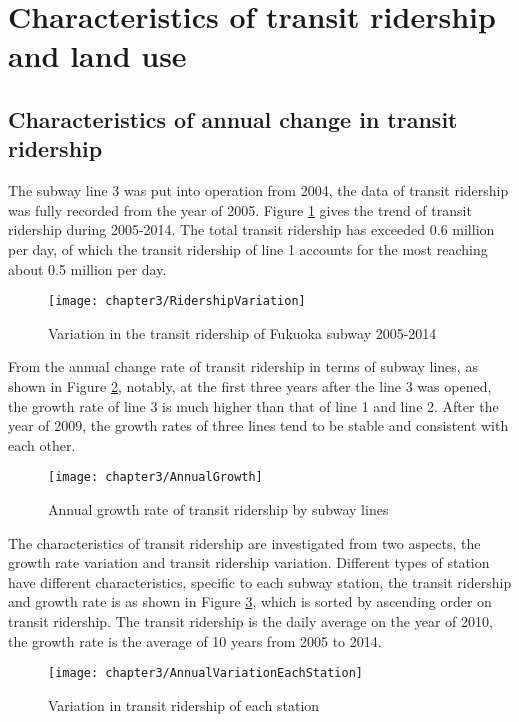 %
\section{Characteristics of transit ridership and land use}
%
\subsection{Characteristics of annual change in transit ridership}
%
The subway line 3 was put into operation from 2004, the data of transit ridership was fully recorded from the year of 2005. Figure \ref{fig:chp3:RidershipVariation} gives the trend of transit ridership during 2005-2014. The total transit ridership has exceeded 0.6 million per day, of which the transit ridership of line 1 accounts for the most reaching about 0.5 million per day.

\begin{figure}[htbp]
	\centering
	\texttt{[image: chapter3/RidershipVariation]}
	\caption{Variation in the transit ridership of Fukuoka subway 2005-2014}
	\label{fig:chp3:RidershipVariation}
\end{figure}

%
From the annual change rate of transit ridership in terms of subway lines, as shown in Figure \ref{fig:chp3:AnnualGrowth}, notably, at the first three years after the line 3 was opened, the growth rate of line 3 is much higher than that of line 1 and line 2. After the year of 2009, the growth rates of three lines tend to be stable and consistent with each other.

%
\begin{figure}[htbp]
	\centering
	\texttt{[image: chapter3/AnnualGrowth]}
	\caption{Annual growth rate of transit ridership by subway lines}
	\label{fig:chp3:AnnualGrowth}
\end{figure}

%
The characteristics of transit ridership are investigated from two aspects, the growth rate variation and transit ridership variation. Different types of station have different characteristics, specific to each subway station, the transit ridership and growth rate is as shown in Figure \ref{fig:chp3:AnnualVariationEachStation}, which is sorted by ascending order on transit ridership. The transit ridership is the daily average on the year of 2010, the growth rate is the average of 10 years from 2005 to 2014. 

%
\begin{figure}[htbp]
	\centering
	\texttt{[image: chapter3/AnnualVariationEachStation]}
	\caption{Variation in transit ridership of each station}
	\label{fig:chp3:AnnualVariationEachStation}
\end{figure}

